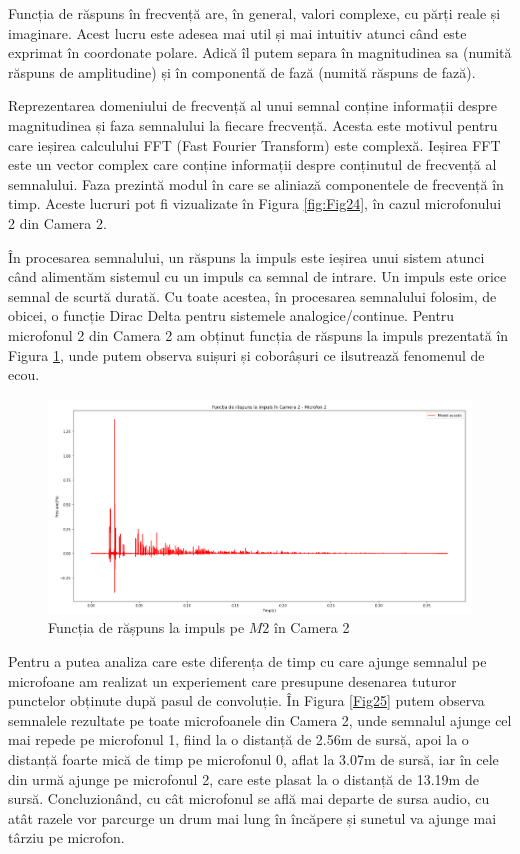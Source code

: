 	Funcția de răspuns în frecvență are, în general, valori complexe, cu părți reale și imaginare. Acest lucru este adesea mai util și mai intuitiv atunci când este exprimat în coordonate polare. Adică îl putem separa în magnitudinea sa (numită răspuns de amplitudine) și în
	componentă de fază (numită răspuns de fază).
	
	Reprezentarea domeniului de frecvență al unui semnal conține informații despre magnitudinea și faza semnalului la fiecare frecvență. Acesta este motivul pentru care ieșirea calculului FFT (Fast Fourier Transform) este complexă. Ieșirea FFT este un vector complex care conține informații despre conținutul de frecvență al semnalului. Faza prezintă modul în care se aliniază componentele de frecvență în timp. Aceste lucruri pot fi vizualizate în Figura \ref{fig:Fig24}, în cazul microfonului 2 din Camera 2.

	În procesarea semnalului, un răspuns la impuls este ieșirea unui sistem atunci când alimentăm sistemul cu un impuls ca semnal de intrare. Un impuls este orice semnal de scurtă durată. Cu toate acestea, în procesarea semnalului folosim, de obicei, o funcție Dirac Delta pentru sistemele analogice/continue. Pentru microfonul 2 din Camera 2 am obținut funcția de răspuns la impuls prezentată în Figura \ref{ir}, unde putem observa suișuri și coborâșuri ce ilsutrează fenomenul de ecou. 
	
	\begin{figure}[!htb]
		\centering
		\includegraphics[width=1\linewidth]{imagini/ir.png}
		\caption{Funcția de rășpuns la impuls pe $M2$ în Camera 2}
		\label{ir}
	\end{figure}
	
	Pentru a putea analiza care este diferența de timp cu care ajunge semnalul pe microfoane am realizat un experiement care presupune desenarea tuturor punctelor obținute după pasul de convoluție. În Figura \ref{Fig25} putem observa semnalele rezultate pe toate microfoanele din Camera 2, unde semnalul ajunge cel mai repede pe microfonul 1, fiind la o distanță de 2.56m de sursă, apoi la o distanță foarte mică de timp pe microfonul 0, aflat la 3.07m de sursă, iar în cele din urmă ajunge pe microfonul 2, care este plasat la o distanță de 13.19m de sursă. Concluzionând, cu cât microfonul se află mai departe de sursa audio, cu atât razele vor parcurge un drum mai lung în încăpere și sunetul va ajunge mai târziu pe microfon.
		
